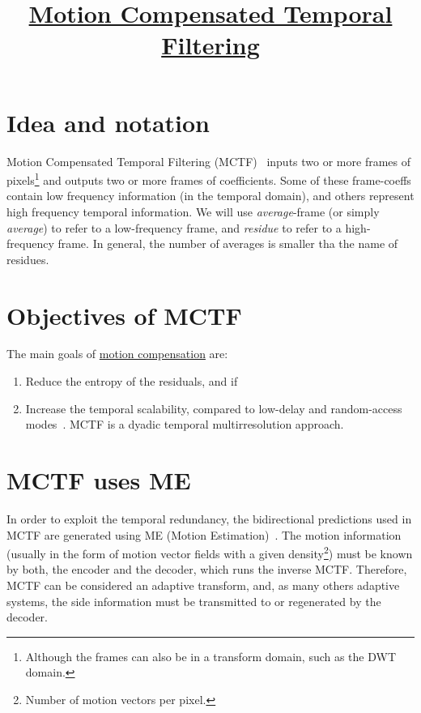 
\title{\href{https://github.com/vicente-gonzalez-ruiz/MCTF}{Motion Compensated Temporal Filtering}}

\maketitle

\section{Idea and notation}

Motion Compensated Temporal Filtering (MCTF)~\cite{ohm1994three}
inputs two or more frames of pixels\footnote{Although the frames can
  also be in a transform domain, such as the DWT domain.} and outputs
two or more frames of coefficients. Some of these frame-coeffs contain
low frequency information (in the temporal domain), and others
represent high frequency temporal information. We will use
\emph{average}-frame (or simply \emph{average}) to refer to a
low-frequency frame, and \emph{residue} to refer to a high-frequency
frame. In general, the number of averages is smaller tha the name of
residues.


\section{Objectives of MCTF}

The main goals of
\href{https://en.wikipedia.org/wiki/Motion_compensation}{motion
  compensation} are:
\begin{enumerate}
\item Reduce the entropy of the residuals, and if
\item Increase the temporal scalability, compared to low-delay and
  random-access modes~\cite{vruiz__sistemas_multimedia}. MCTF is a
  dyadic temporal multirresolution approach.
\end{enumerate}
  

\section{MCTF uses ME}

In order to exploit the temporal redundancy, the bidirectional
predictions used in MCTF are generated using ME (Motion
Estimation)~\cite{vruiz__ME}. The motion information (usually in the
form of motion vector fields with a given density\footnote{Number of
  motion vectors per pixel.}) must be known by both, the encoder and
the decoder, which runs the inverse MCTF. Therefore, MCTF can be
considered an adaptive transform, and, as many others adaptive
systems, the side information must be transmitted to or regenerated by
the decoder.

